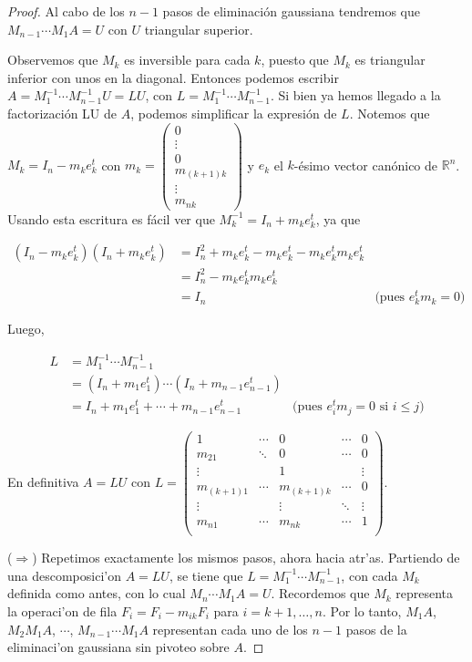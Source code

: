 \begin{propo}
\begin{proof}
Al cabo de los $n - 1$ pasos de eliminación gaussiana tendremos que $M_{n - 1} \cdots M_1 A = U$ con $U$ triangular superior.

Observemos que $M_k$ es inversible para cada $k$, puesto que $M_k$ es triangular inferior con unos en la diagonal. Entonces podemos escribir $A = M_1^{-1}\cdots M_{n - 1}^{-1} U = LU$, con $L = M_1^{-1}\cdots M_{n - 1}^{-1}$. Si bien ya hemos llegado a la factorización LU de $A$, podemos simplificar la expresión de $L$. Notemos que $M_k = I_n - m_k e_k^t$ con $m_k = \begin{pmatrix}0\\ \vdots \\ 0 \\ m_{(k+1)k} \\ \vdots \\ m_{nk}\end{pmatrix}$ y $e_k$ el $k$-ésimo vector canónico de $\mathbb{R}^n$. Usando esta escritura es fácil ver que $M_k^{-1} = I_n + m_k e_k^t$, ya que

\begin{align*}
(I_n - m_k e_k^t)(I_n + m_k e_k^t) & = I_n^2 + m_k e_k^t - m_k e_k^t - m_k e_k^t m_k e_k^t &\\
& = I_n^2 - m_k e_k^t m_k e_k^t &\\
& = I_n & \text{(pues } e_k^t m_k = 0\text{)}
\end{align*}

Luego,

\begin{align*}
L & = M_1^{-1} \cdots M_{n - 1}^{-1} &\\
	& = (I_n + m_1 e_1^t) \cdots (I_n + m_{n - 1} e_{n - 1}^t) &\\
	& = I_n + m_1 e_1^t + \cdots + m_{n - 1} e_{n - 1}^t & \text{(pues } e_i^t m_j = 0 \text{ si } i \leq j \text{)}
\end{align*}

En definitiva $A = LU$ con $L = \begin{pmatrix}
1 			& \cdots 	& 0 				& \cdots 	& 0 \\
m_{21} 		& \ddots 	& 0 				& \cdots 	& 0 \\
\vdots 		& 			& 1 				& 			& \vdots\\
m_{(k+1)1}	& \cdots		& m_{(k+1)k} 	& \cdots		& 0\\
\vdots		& 			& \vdots		 	& \ddots		& \vdots\\
m_{n1}		& \cdots		& m_{nk}		& \cdots		& 1\\
\end{pmatrix}$.

($\Rightarrow$) Repetimos exactamente los mismos pasos, ahora hacia atr'as. Partiendo de una descomposici'on $A = LU$, se tiene que $L = M_1^{-1}\cdots M_{n - 1}^{-1}$, con cada $M_k$ definida como antes, con lo cual $M_n \cdots M_1 A = U$. Recordemos que $M_k$ representa la operaci'on de fila $F_i = F_i - m_{ik}F_i$ para $i = k + 1, \dots, n$. Por lo tanto, $M_1A$, $M_2 M_1 A$, $\cdots$, $M_{n - 1} \cdots M_1 A$ representan cada uno de los $n - 1$ pasos de la eliminaci'on gaussiana sin pivoteo sobre $A$.

	\end{proof}
\end{propo}
